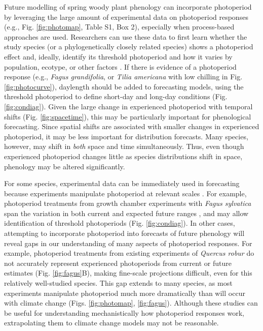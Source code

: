 \documentclass{article}
\begin{document}
\par Future modelling of spring woody plant phenology can incorporate photoperiod by leveraging the large amount of experimental data on photoperiod responses (e.g., Fig. \ref{fig:photomap}, Table S1, Box 2), especially when process-based approaches are used. Researchers can use these data to first learn whether the study species (or a phylogenetically closely related species) shows a photoperiod effect and, ideally, identify its threshold photoperiod and how it varies by population, ecotype, or other factors \citep{tobin2008,bradshaw2006,gwinner1996}. If there is evidence of a photoperiod response (e.g., \emph{Fagus grandifolia}, or \emph{Tilia americana} with low chilling in Fig. \ref {fig:photocurve}), daylength should be added to forecasting models, using the threshold photoperiod to define short-day and long-day conditions (Fig. \ref{fig:condiag}). Given the large change in experienced photoperiod with temporal shifts (Fig. \ref{fig:spacetime}), this may be particularly important for phenological forecasting. Since spatial shifts are associated with smaller changes in experienced photoperiod, it may be less important for distribution forecasts. Many species, however, may shift in \emph{both} space and time simultaneously. Thus, even though experienced photoperiod changes little as species distributions shift in space, phenology may be altered significantly.

\par For some species, experimental data can be immediately used in forecasting because experiments manipulate photoperiod at relevant scales \citep[e.g., ][Figs. \ref{fig:photomap}, \ref{fig:fagus}A, Table S1]{Heide:2015aa,Basler:2014aa}. For example, photoperiod treatments from growth chamber experiments with \emph{Fagus sylvatica} span the variation in both current and expected future ranges \citep[Fig. \ref{fig:fagus}A, ][]{duputie2015}, and may allow identification of threshold photoperiods (Fig. \ref{fig:condiag}). In other cases, attempting to incorporate photoperiod into forecasts of future phenology will reveal gaps in our understanding of many aspects of photoperiod responses. For example, photoperiod treatments from existing experiments of \emph{Quercus robur} do not accurately represent experienced photoperiods from current or future estimates (Fig. \ref{fig:fagus}B), making fine-scale projections difficult, even for this relatively well-studied species. This gap extends to many species, as most experiments manipulate photoperiod much more dramatically than will occur with climate change (Figs. \ref{fig:photomap}, \ref{fig:fagus}). Although these studies can be useful for understanding mechanistically how photoperiod responses work, extrapolating them to climate change models may not be reasonable. 
 
\end{document}

